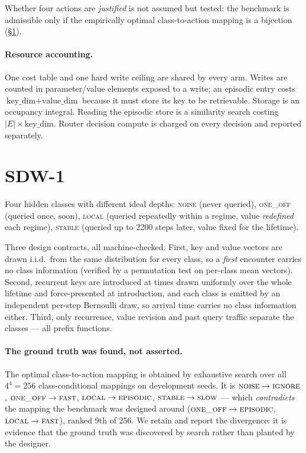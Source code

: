 \documentclass[11pt]{article}
\begin{document}
Whether four actions are \emph{justified} is not assumed but tested: the
benchmark is admissible only if the empirically optimal class-to-action mapping
is a bijection (\S\ref{sec:bench}).

\paragraph{Resource accounting.} One cost table and one hard write ceiling are
shared by every arm. Writes are counted in parameter/value elements exposed to a
write; an episodic entry costs $\text{key\_dim} + \text{value\_dim}$ because it
must store its key to be retrievable. Storage is an occupancy integral. Reading
the episodic store is a similarity search costing $|E| \times \text{key\_dim}$.
Router decision compute is charged on every decision and reported separately.

\section{SDW-1}
\label{sec:bench}

Four hidden classes with different ideal depths: \textsc{noise} (never queried),
\textsc{one\_off} (queried once, soon), \textsc{local} (queried repeatedly
within a regime, value \emph{redefined} each regime), \textsc{stable} (queried
up to 2200 steps later, value fixed for the lifetime).

Three design contracts, all machine-checked. First, key and value vectors are
drawn i.i.d.\ from the same distribution for every class, so a \emph{first}
encounter carries no class information (verified by a permutation test on
per-class mean vectors). Second, recurrent keys are introduced at times drawn
uniformly over the whole lifetime and force-presented at introduction, and each
class is emitted by an independent per-step Bernoulli draw, so arrival time
carries no class information either. Third, only recurrence, value revision and
past query traffic separate the classes --- all prefix functions.

\paragraph{The ground truth was found, not asserted.} The optimal
class-to-action mapping is obtained by exhaustive search over all $4^4 = 256$
class-conditional mappings on development seeds. It is
$\textsc{noise} \to \textsc{ignore}$, $\textsc{one\_off} \to \textsc{fast}$,
$\textsc{local} \to \textsc{episodic}$, $\textsc{stable} \to \textsc{slow}$ ---
which \emph{contradicts} the mapping the benchmark was designed around
($\textsc{one\_off} \to \textsc{episodic}$, $\textsc{local} \to \textsc{fast}$),
ranked 9th of 256. We retain and report the divergence: it is evidence that the
ground truth was discovered by search rather than planted by the designer.
\end{document}
